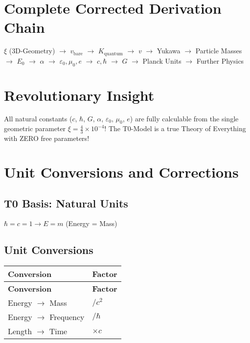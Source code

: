 \documentclass[12pt,a4paper]{article}
\begin{document}
	\section{Complete Corrected Derivation Chain}
	\begin{center}
		\parbox{10cm}{\centering $\xi$ (3D-Geometry) $\rightarrow$ $v_{\text{bare}}$ $\rightarrow$ $K_{\text{quantum}}$ $\rightarrow$ $v$ $\rightarrow$ Yukawa $\rightarrow$ Particle Masses $\rightarrow$ $E_0$ $\rightarrow$ $\alpha$ $\rightarrow$ $\varepsilon_0, \mu_0, e$ $\rightarrow$ $c, \hbar$ $\rightarrow$ $G$ $\rightarrow$ Planck Units $\rightarrow$ Further Physics}
	\end{center}
	
	\section{Revolutionary Insight}
	All natural constants ($c$, $\hbar$, $G$, $\alpha$, $\varepsilon_0$, $\mu_0$, $e$) are fully calculable from the single geometric parameter $\xi = \frac{4}{3} \times 10^{-4}$! The T0-Model is a true Theory of Everything with ZERO free parameters!
	
	\section{Unit Conversions and Corrections}
	\subsection{T0 Basis: Natural Units}
	\begin{center}
		$\hbar = c = 1 \rightarrow E = m$ (Energy = Mass)
	\end{center}
	
	\subsection{Unit Conversions}
	\begin{longtable}{|p{5cm}|p{5cm}|}
		\hline
		\textbf{Conversion} & \textbf{Factor} \\
		\hline
		\endfirsthead
		\hline
		\textbf{Conversion} & \textbf{Factor} \\
		\hline
		\endhead
		Energy $\rightarrow$ Mass & $/c^{2}$ \\
		\hline
		Energy $\rightarrow$ Frequency & $/\hbar$ \\
		\hline
		Length $\rightarrow$ Time & $\times c$ \\
		\hline
	\end{longtable}
	
\end{document}
